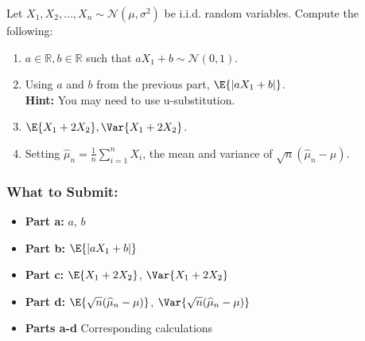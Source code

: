 \documentclass{article}
\begin{document}
\begin{aprob}
    Let $X_1, X_2, ..., X_n \sim \mathcal{N}(\mu, \sigma^2)$ be i.i.d. random variables. Compute the following:
    \begin{enumerate}
        \item {} $a\in{\mathbb R},b\in{\mathbb R}$ such that $aX_1+b \sim \mathcal{N}(0,1)$.
        \item {} Using $a$ and $b$ from the previous part, $\E{|aX_1+b|}$.\\ \textbf{Hint:} You may need to use u-substitution.
        \item {} $\E{X_1 + 2X_2}, \Var{X_1 + 2X_2}$.
        \item {} Setting $\widehat{\mu}_n = \frac{1}{n} \sum_{i=1}^n X_i$, the mean and variance of $\sqrt{n}(\widehat{\mu}_n - \mu)$.
    \end{enumerate}

    \subsubsection*{What to Submit:}
    \begin{itemize}
        \item \textbf{Part a:} $a$, $b$
        \item \textbf{Part b:} $\E{|aX_1+b|}$
        \item \textbf{Part c:} $\E{X_1 + 2X_2}$, $\Var{X_1 + 2X_2}$
        \item \textbf{Part d:} $\E{\sqrt{n}(\widehat{\mu}_n - \mu)}$, $\Var{\sqrt{n}(\widehat{\mu}_n - \mu)}$
        \item \textbf{Parts a-d} Corresponding calculations
    \end{itemize}
\end{aprob}
\end{document}
